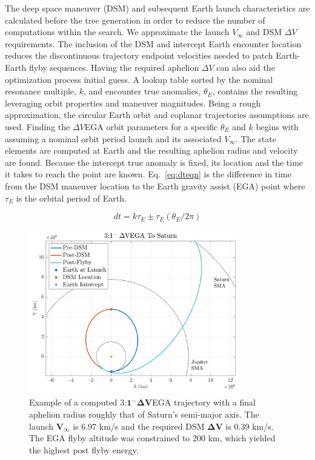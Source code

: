 \documentclass[letterpaper, preprint, paper,11pt]{AAS}	%
\begin{document}
The deep space maneuver (DSM) and subsequent Earth launch characteristics are calculated before the tree generation in order to reduce the number of computations within the search. We approximate the launch $V_\infty$ and DSM $\Delta V$ requirements. The inclusion of the DSM and intercept Earth encounter location reduces the discontinuous trajectory endpoint velocities needed to patch Earth-Earth flyby sequences. Having the required aphelion $\Delta V$ can also aid the optimization process initial guess. A lookup table sorted by the nominal resonance multiple, $k$, and encounter true anomalies, $\theta_{E}$, contains the resulting leveraging orbit properties and maneuver magnitudes. Being a rough approximation, the circular Earth orbit and coplanar trajectories assumptions are used. Finding the $\Delta V$EGA orbit parameters for a specific $\theta_{E}$ and $k$ begins with assuming a nominal orbit period launch and its associated $V_\infty$. The state elements are computed at Earth and the resulting aphelion radius and velocity are found. Because the intercept true anomaly is fixed, its location and the time it takes to reach the point are known. Eq.~\eqref{eq:dteqn} is the difference in time from the DSM maneuver location to the Earth gravity assist (EGA) point where $\tau_E$ is the orbital period of Earth.

\begin{equation}
	\label{eq:dteqn}
	dt = k\tau_E \pm \tau_E(\theta_E/2\pi)
\end{equation}

\begin{figure}[htb]
	\centering\includegraphics[width=3.6in]{./fig/dsmmatlab}
    \caption{Example of a computed 3:$\boldsymbol{1^- \Delta V}$EGA trajectory with a final aphelion radius roughly that of Saturn's semi-major axis. The launch $\boldsymbol{V_\infty}$ is 6.97 km/s and the required DSM $\boldsymbol{\Delta V}$ is 0.39 km/s. The EGA flyby altitude was constrained to 200 km, which yielded the highest post flyby energy.}
	\label{fig:dsmmatlab}
\end{figure}
\end{document}
